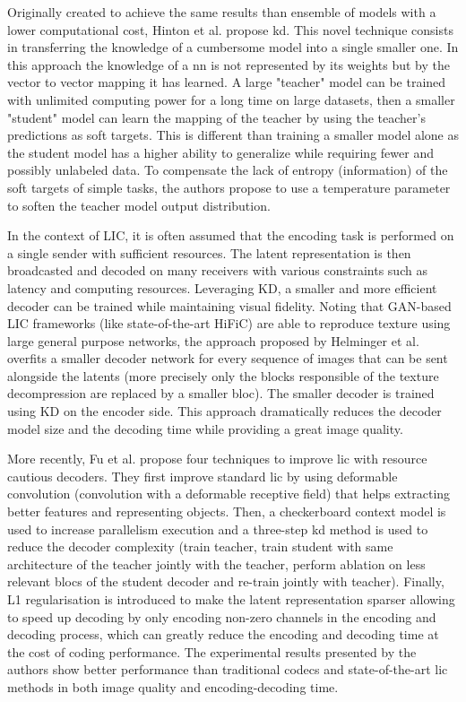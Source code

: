 \documentclass{article}
\begin{document}
Originally created to achieve the same results than ensemble of models with a lower computational cost, Hinton et al. \cite{hinton2015distillingknowledgeneuralnetwork} propose \acrlong{kd}. This novel technique consists in transferring the knowledge of a cumbersome model into a single smaller one. In this approach the knowledge of a \acrshort{nn} is not represented by its weights but by the vector to vector mapping it has learned. A large "teacher" model can be trained with unlimited computing power for a long time on large datasets, then a smaller "student" model can learn the mapping of the teacher by using the teacher's predictions as soft targets. This is different than training a smaller model alone as the student model has a higher ability to generalize while requiring fewer and possibly unlabeled data. To compensate the lack of entropy (information) of the soft targets of simple tasks, the authors propose to use a temperature parameter to soften the teacher model output distribution.

In the context of LIC, it is often assumed that the encoding task is performed on a single sender with sufficient resources. The latent representation is then broadcasted and decoded on many receivers with various constraints such as latency and computing resources. Leveraging KD, a smaller and more efficient decoder can be trained while maintaining visual fidelity. Noting that GAN-based LIC frameworks (like state-of-the-art HiFiC) are able to reproduce texture using large general purpose networks, the approach proposed by Helminger et al. \cite{helminger2022microdosingknowledgedistillationgan} overfits a smaller decoder network for every sequence of images that can be sent alongside the latents (more precisely only the blocks responsible of the texture decompression are replaced by a smaller bloc). The smaller decoder is trained using KD on the encoder side. This approach dramatically reduces the decoder model size and the decoding time while providing a great image quality.

More recently, Fu et al. \cite{fu2023fasthighperformancelearnedimage} propose four techniques to improve \acrshort{lic} with resource cautious decoders. They first improve standard \acrshort{lic} by using deformable convolution (convolution with a deformable receptive field) that helps extracting better features and representing objects. Then, a checkerboard context model is used to increase parallelism execution and a three-step \acrshort{kd} method is used to reduce the decoder complexity (train teacher, train student with same architecture of the teacher jointly with the teacher, perform ablation on less relevant blocs of the student decoder and re-train jointly with teacher). Finally, L1 regularisation is introduced to make the latent representation sparser allowing to speed up decoding by only encoding non-zero channels in the encoding and decoding process, which can greatly reduce the encoding and decoding time at the cost of coding performance. The experimental results presented by the authors show better performance than traditional codecs and state-of-the-art \acrshort{lic} methods in both image quality and encoding-decoding time.
\end{document}
